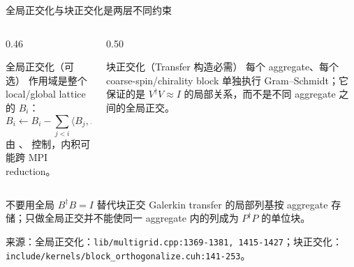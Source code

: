 \documentclass[UTF8,aspectratio=169,11pt]{ctexbeamer}
\newcommand{\source}[1]{\vspace{0.05em}\par{\raggedright\scriptsize\color{muted}来源：#1\par}}
\newcommand{\codepath}[1]{\nolinkurl{#1}}
\begin{document}
\begin{frame}[t]{全局正交化与块正交化是两层不同约束}
  \begin{columns}[T,totalwidth=\textwidth]
    \begin{column}{0.46\textwidth}
      \begin{block}{全局正交化（可选）}
        作用域是整个 local/global lattice 的 \(B_i\)：
        \[
          B_i\leftarrow B_i-\sum_{j<i}\langle B_j,B_i\rangle B_j,
          \quad B_i\leftarrow B_i/\|B_i\|.
        \]
        由 \texttt{}、\texttt{} 控制，内积可能跨 MPI reduction。
      \end{block}
    \end{column}
    \begin{column}{0.50\textwidth}
      \begin{block}{块正交化（Transfer 构造必需）}
        每个 aggregate、每个 coarse-spin/chirality block 单独执行 Gram--Schmidt；它保证的是 \(V^\dagger V\approx I\) 的局部关系，而不是不同 aggregate 之间的全局正交。
      \end{block}
      \begin{center}
      \end{center}
    \end{column}
  \end{columns}
  \vspace{0.16cm}
  \begin{alertblock}{不要用全局 \(B^\dagger B=I\) 替代块正交}
    Galerkin transfer 的局部列基按 aggregate 存储；只做全局正交并不能使同一 aggregate 内的列成为 \(P^\dagger P\) 的单位块。
  \end{alertblock}
  \source{全局正交化：\codepath{lib/multigrid.cpp:1369-1381, 1415-1427}；块正交化：\codepath{include/kernels/block_orthogonalize.cuh:141-253}。}
\end{frame}
\end{document}
